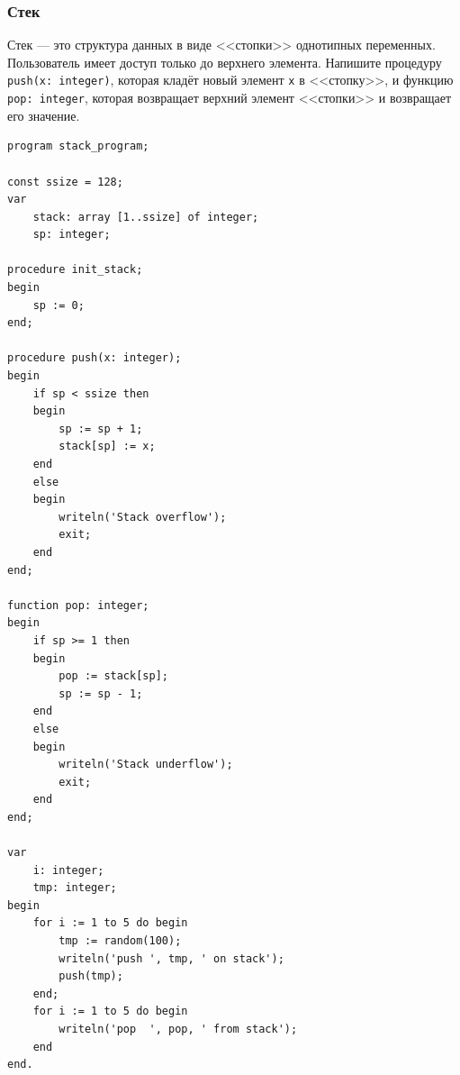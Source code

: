 \documentclass[10,a4paper]{article}
\begin{document}
\subsubsection{Стек}
Стек --- это структура данных в виде <<стопки>> однотипных переменных.
Пользователь имеет доступ только до верхнего элемента.
Напишите процедуру \texttt{push(x: integer)}, которая кладёт новый
элемент \texttt{x} в <<стопку>>, и функцию \texttt{pop: integer},
которая возвращает верхний элемент <<стопки>> и возвращает его значение.
\begin{lstlisting}
program stack_program;

const ssize = 128;
var
    stack: array [1..ssize] of integer;
    sp: integer;

procedure init_stack;
begin
    sp := 0;
end;

procedure push(x: integer);
begin
    if sp < ssize then
    begin
        sp := sp + 1;
        stack[sp] := x;
    end
    else
    begin
        writeln('Stack overflow');
        exit;
    end
end;

function pop: integer;
begin
    if sp >= 1 then
    begin
        pop := stack[sp];
        sp := sp - 1;
    end
    else
    begin
        writeln('Stack underflow');
        exit;
    end
end;

var
    i: integer;
    tmp: integer;
begin
    for i := 1 to 5 do begin
        tmp := random(100);
        writeln('push ', tmp, ' on stack');
        push(tmp);
    end;
    for i := 1 to 5 do begin
        writeln('pop  ', pop, ' from stack');
    end
end.
\end{lstlisting}
\end{document}
